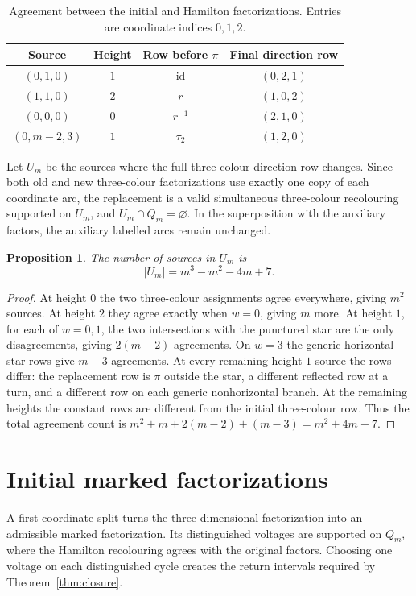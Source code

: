 \documentclass[11pt,reqno]{amsart}
\numberwithin{equation}{section}
\newtheorem{proposition}[theorem]{Proposition}
\theoremstyle{definition}
\theoremstyle{remark}
\newcommand{\id}{\operatorname{id}}
\begin{document}
\begin{table}[htbp]
\centering
\caption{Agreement between the initial and Hamilton factorizations. Entries are
coordinate indices $0,1,2$.}\label{tab:anchors}
\begin{tabular}{cccc}
\toprule
Source & Height & Row before $\pi$ & Final direction row\\
\midrule
$(0,1,0)$ & $1$ & $\id$ & $(0,2,1)$\\
$(1,1,0)$ & $2$ & $r$ & $(1,0,2)$\\
$(0,0,0)$ & $0$ & $r^{-1}$ & $(2,1,0)$\\
$(0,m-2,3)$ & $1$ & $\tau_2$ & $(1,2,0)$\\
\bottomrule
\end{tabular}
\end{table}

Let $U_m$ be the sources where the full three-colour direction row changes. Since both
old and new three-colour factorizations use exactly one copy of each coordinate arc,
the replacement is a valid simultaneous three-colour recolouring supported on
$U_m$, and $U_m\cap Q_m=\varnothing$. In the superposition with the auxiliary
factors, the auxiliary labelled arcs remain unchanged.

\begin{proposition}\label{prop:patch-size}
The number of sources in $U_m$ is
\begin{equation}\label{eq:patch-size}
 |U_m|=m^3-m^2-4m+7.
\end{equation}
\end{proposition}
\begin{proof}
At height $0$ the two three-colour assignments agree everywhere, giving $m^2$ sources.
At height $2$ they agree exactly when $w=0$, giving $m$ more. At height $1$, for
each of $w=0,1$, the two intersections with the punctured star are the only
disagreements, giving $2(m-2)$ agreements. On $w=3$ the generic horizontal-star
rows give $m-3$ agreements. At every remaining height-$1$ source the rows differ: the replacement row
is $\pi$ outside the star, a different reflected row at a turn, and a
different row on each generic nonhorizontal branch. At the remaining heights the
constant rows are different from the initial three-colour row. Thus the total agreement
count is $m^2+m+2(m-2)+(m-3)=m^2+4m-7$.
\end{proof}

\section{Initial marked factorizations}\label{sec:entry}
A first coordinate split turns the three-dimensional factorization into
an admissible marked factorization. Its distinguished voltages are
supported on $Q_m$, where the Hamilton recolouring agrees with the
original factors. Choosing one voltage on each distinguished cycle
creates the return intervals required by Theorem~\ref{thm:closure}.
\end{document}
